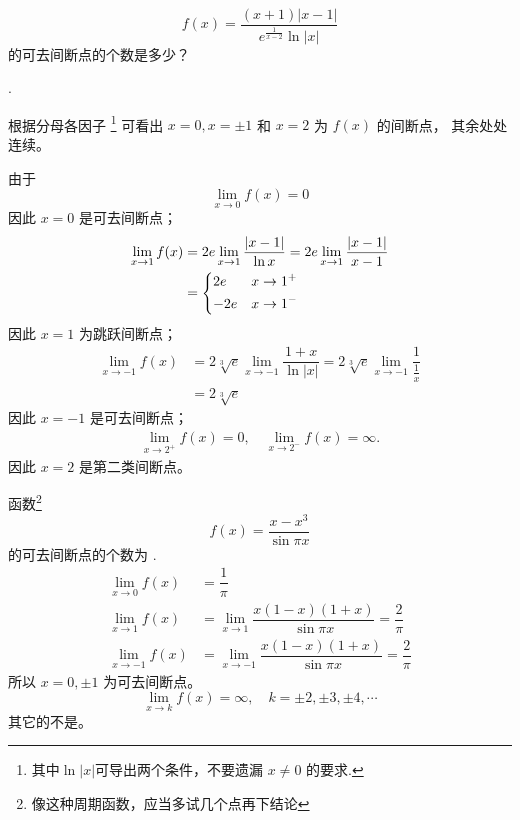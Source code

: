 \begin{example}
    \[
        f(x) = \dfrac{(x+1) | x-1 |}{e^{\frac{1}{x-2}} \ln |x|}
    \]
    的可去间断点的个数是多少？

    \cite[page 46, pdf 57, example 4]{we}.

    根据分母各因子
    \footnote{其中$\ln |x|$可导出两个条件，不要遗漏 $x \neq 0$ 的要求.}
    可看出 $x = 0, x = \pm 1$ 和 $x = 2$ 为 $f(x)$ 的间断点，
    其余处处连续。

    由于
    \[
        \lim_{x \to 0} f(x) = 0
    \]
    因此 $x = 0$ 是可去间断点；
    \begin{align*}
        \lim_{x \to 1} f(x) &= 2e \lim_{x\to 1} \dfrac{|x - 1|}{\ln x} = 2e \lim_{x\to 1} \dfrac{|x - 1|}{x - 1} \\
                            &= 
                            \begin{dcases}
                                2e & x \to 1^+ \\
                                -2e & x \to 1^-
                            \end{dcases}
    \end{align*}
    因此 $x = 1$ 为跳跃间断点；
    \begin{align*}
        \lim_{x \to -1} f(x) &= 2 \sqrt[3]{e} \lim_{x \to -1} \dfrac{1 + x}{\ln |x|} = 2 \sqrt[3]{e} \lim_{x \to -1} \dfrac{1}{\frac{1}{x}} \\
                             &= 2 \sqrt[3]{e}
    \end{align*}
    因此 $x = -1$ 是可去间断点；
    \begin{align*}
        \lim_{x \to 2^+} f(x) = 0, \quad \lim_{x \to 2^-} f(x) = \infty.
    \end{align*}
    因此 $x = 2$ 是第二类间断点。
\end{example}

\begin{example}
    函数\footnote{像这种周期函数，应当多试几个点再下结论}
    \[
        f(x) = \dfrac{x - x^3}{\sin \pi x}
    \]
    的可去间断点的个数为
    \cite[page 62, question (2009)]{yc}.
    \begin{align*}
        \lim_{x \to 0}  f(x) &= \dfrac{1}{\pi}\\
        \lim_{x \to 1}  f(x) &= \lim_{x \to  1} \dfrac{x(1-x)(1+x)}{\sin \pi x} = \dfrac{2}{\pi}\\
        \lim_{x \to -1} f(x) &= \lim_{x \to -1} \dfrac{x(1-x)(1+x)}{\sin \pi x} = \dfrac{2}{\pi}
    \end{align*}
    所以 $x = 0, \pm 1$ 为可去间断点。
    \[
        \lim_{x \to k} f(x) = \infty, \quad k = \pm 2, \pm 3, \pm 4, \cdots
    \]
    其它的不是。
\end{example}

